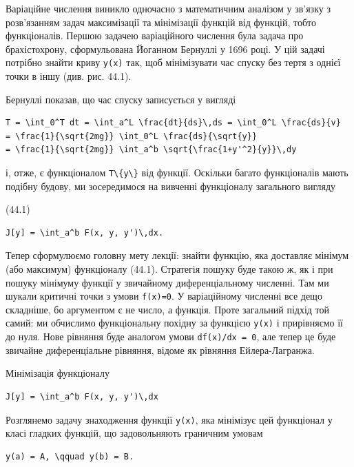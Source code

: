 \documentclass[
  ukrainian,
]{article}
\begin{document}
Варіаційне числення виникло одночасно з математичним аналізом у зв'язку
з розв'язанням задач максимізації та мінімізації функцій від функцій,
тобто функціоналів. Першою задачею варіаційного числення була задача про
брахістохрону, сформульована Йоганном Бернуллі у 1696 році. У цій задачі
потрібно знайти криву \texttt{y(x)} так, щоб мінімізувати час спуску без
тертя з однієї точки в іншу (див. рис. 44.1).

Бернуллі показав, що час спуску записується у вигляді

\begin{verbatim}
T = \int_0^T dt = \int_a^L \frac{dt}{ds}\,ds = \int_0^L \frac{ds}{v}
= \frac{1}{\sqrt{2mg}} \int_0^L \frac{ds}{\sqrt{y}}
= \frac{1}{\sqrt{2mg}} \int_a^b \sqrt{\frac{1+y'^2}{y}}\,dy
\end{verbatim}

і, отже, є функціоналом \texttt{T\textbackslash{}\{y\textbackslash{}\}}
від функції. Оскільки багато функціоналів мають подібну будову, ми
зосередимося на вивченні функціоналу загального вигляду

(44.1)

\begin{verbatim}
J[y] = \int_a^b F(x, y, y')\,dx.
\end{verbatim}

Тепер сформулюємо головну мету лекції: знайти функцію, яка доставляє
мінімум (або максимум) функціоналу (44.1). Стратегія пошуку буде такою
ж, як і при пошуку мінімуму функції у звичайному диференціальному
численні. Там ми шукали критичні точки з умови
\texttt{f\textquotesingle{}(x)=0}. У варіаційному численні все дещо
складніше, бо аргументом є не число, а функція. Проте загальний підхід
той самий: ми обчислимо функціональну похідну за функцією \texttt{y(x)}
і прирівняємо її до нуля. Нове рівняння буде аналогом умови
\texttt{df(x)/dx\ =\ 0}, але тепер це буде звичайне диференціальне
рівняння, відоме як рівняння Ейлера-Лагранжа.

Мінімізація функціоналу

\begin{verbatim}
J[y] = \int_a^b F(x, y, y')\,dx
\end{verbatim}

Розглянемо задачу знаходження функції \texttt{y(x)}, яка мінімізує цей
функціонал у класі гладких функцій, що задовольняють граничним умовам

\begin{verbatim}
y(a) = A, \qquad y(b) = B.
\end{verbatim}
\end{document}
